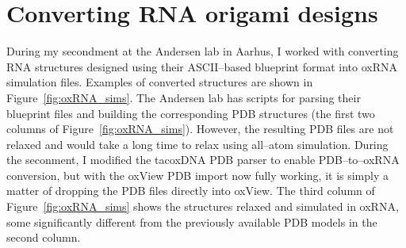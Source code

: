 \section{Converting RNA origami designs}
\label{sec:converting_rna_origami}
During my secondment at the Andersen lab in Aarhus, I worked with converting RNA structures designed using their ASCII--based blueprint format into oxRNA simulation files. Examples of converted structures are shown in Figure~\ref{fig:oxRNA_sims}. The Andersen lab has scripts for parsing their blueprint files and building the corresponding PDB structures (the first two columns of Figure~\ref{fig:oxRNA_sims}). However, the resulting PDB files are not relaxed and would take a long time to relax using all--atom simulation. During the seconment, I modified the tacoxDNA \cite{suma2019tacoxdna} PDB parser to enable PDB--to--oxRNA conversion, but with the oxView PDB import now fully working, it is simply a matter of dropping the PDB files directly into oxView. The third column of Figure~\ref{fig:oxRNA_sims} shows the structures relaxed and simulated in oxRNA, some significantly different from the previously available PDB models in the second column.


